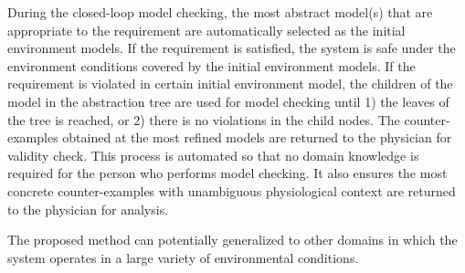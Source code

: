 During the closed-loop model checking, the most abstract model(s) that are appropriate to the requirement are automatically selected as the initial environment models. If the requirement is satisfied, the system is safe under the environment conditions covered by the initial environment models. If the requirement is violated in certain initial environment model, the children of the model in the abstraction tree are used for model checking until 1) the leaves of the tree is reached, or 2) there is no violations in the child nodes. The counter-examples obtained at the most refined models are returned to the physician for validity check. This process is automated so that no domain knowledge is required for the person who performs model checking. It also ensures the most concrete counter-examples with unambiguous physiological context are returned to the physician for analysis. 


%
The proposed method can potentially generalized to other domains in which the system operates in a large variety of environmental conditions.
%
